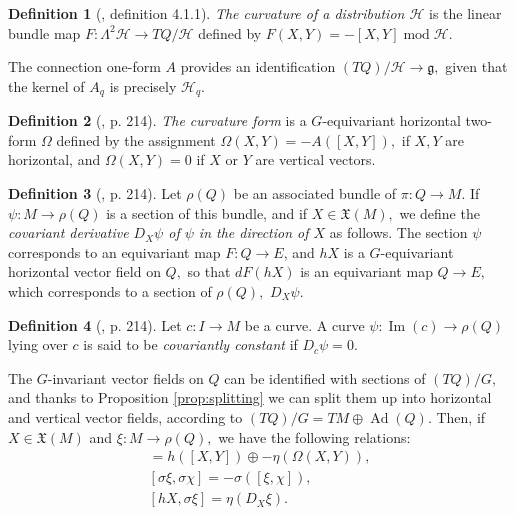 \documentclass[12pt, letterpaper, reqno]{amsart}
\theoremstyle{definition}
\newtheorem{df}{Definition}
\theoremstyle{plain}
\theoremstyle{remark}
\begin{document}
\begin{df}[\cite{montgomery2002tour}, definition 4.1.1]
	\textit{The curvature of a distribution $ \mathcal{H} $ } is the linear bundle map $ F: \Lambda^2 \mathcal{H} \rightarrow TQ/\mathcal{H} $ defined by $ F(X,Y) = -[X,Y] \operatorname{mod} \mathcal{H}.  $ 	
\end{df}
The connection one-form $ A $ provides an identification $ (TQ)/ \mathcal{H} \rightarrow \mathfrak{g}, $ given that the kernel of $ A_q $ is precisely $ \mathcal{H}_q. $ 

\begin{df}[\cite{montgomery2002tour}, p. 214]
	\textit{The curvature form} is a $ G $-equivariant horizontal two-form $ \Omega $ defined by the assignment $ \Omega(X,Y) = -A([X,Y]), $ if $ X,Y $ are horizontal, and $ \Omega(X,Y)=0 $ if $ X $ or $ Y$ are vertical vectors.  
\end{df}

\begin{df}[\cite{montgomery2002tour}, p. 214]
	Let $ \rho(Q) $ be an associated bundle of $ \pi: Q \rightarrow M. $ If $ \psi: M \rightarrow \rho(Q) $ is a section of this bundle, and if $ X\in \mathfrak{X}(M), $ we define the \textit{covariant derivative $ D_X\psi $ of $ \psi $ in the direction of $ X $} as follows. The section $ \psi $ corresponds to an equivariant map $ F: Q \rightarrow E $, and $ hX $ is a $ G $-equivariant horizontal vector field on $ Q, $ so that $ dF(hX) $ is an equivariant map $ Q \rightarrow E, $ which corresponds to a section of $ \rho(Q), $ $ D_X\psi. $ 
\end{df}
\begin{df}[\cite{montgomery2002tour}, p. 214]
	Let $ c:I \rightarrow M $ be a curve. A curve $ \psi: \operatorname{Im} (c) \rightarrow \rho(Q) $ lying over $ c $ is said to be \textit{covariantly constant} if $ D_{\dot{c}}\psi=0. $  	
\end{df}
The $ G $-invariant vector fields on $ Q $ can be identified with sections of $ (TQ)/G, $ and thanks to Proposition \ref{prop:splitting} we can split them up into horizontal and vertical vector fields, according to $ (TQ)/G = TM \oplus \operatorname{Ad} (Q). $ Then, if $ X\in \mathfrak{X}(M) $ and $ \xi: M \rightarrow \rho(Q), $ we have the following relations:
\begin{align}
 [hX, hY] = h([X,Y])\oplus -\eta(\Omega(X,Y)), \tag{horizontal-horizontal}\\
 [\sigma\xi, \sigma\chi] = -\sigma([\xi,\chi]), \tag{vertical-vertical} \\
 [hX,\sigma \xi] = \eta(D_X\xi). \tag{horizontal-vertical} 
\end{align}

\nocite{*}

\end{document}
